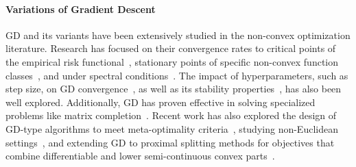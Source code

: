 \paragraph{Variations of Gradient Descent}
GD and its variants have been extensively studied in the non-convex optimization literature. Research has focused on their convergence rates to critical points of the empirical risk functional~\citep{pmlr-v247-patel24a,pmlr-v247-zeng24a}, stationary points of specific non-convex function classes~\citep{faw2023beyond,anonymous2025methods}, and under spectral conditions~\citep{velikanov2024tight}. The impact of hyperparameters, such as step size, on GD convergence~\citep{pmlr-v247-wu24b}, as well as its stability properties~\citep{mulayoff2024exact,zhu2024uniform,zhu2024stability}, has also been well explored. Additionally, GD has proven effective in solving specialized problems like matrix completion~\citep{baes2021low,pmlr-v247-ma24a}.
% 
Recent work has also explored the design of GD-type algorithms to meet meta-optimality criteria~\citep{casgrain2019latent,pmlr-v134-casgrain21a}, studying non-Euclidean settings~\citep{alimisis2021momentum,hsieh2024riemannian}, and extending GD to proximal splitting methods for objectives that combine differentiable and lower semi-continuous convex parts~\citep{patrascu2021stochastic,minh2022strong}.